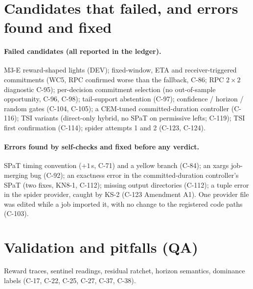 \documentclass[11pt]{article}
\begin{document}
\appendix
\section{Candidates that failed, and errors found and fixed}
\paragraph{Failed candidates (all reported in the ledger).} M3-E reward-shaped lights (DEV); fixed-window, ETA and receiver-triggered
commitments (WC5, RPC confirmed worse than the fallback, C-86; RPC $2\times2$ diagnostic C-95); per-decision commitment selection (no
out-of-sample opportunity, C-96, C-98); tail-support abstention (C-97); confidence / horizon / random gates (C-104, C-105); a CEM-tuned
committed-duration controller (C-116); TSI variants (direct-only hybrid, no SPaT on permissive lefts; C-119); TSI first confirmation
(C-114); spider attempts 1 and 2 (C-123, C-124).
\paragraph{Errors found by self-checks and fixed before any verdict.} SPaT timing convention ($+1$\,s, C-71) and a yellow branch
(C-84); an xargs job-merging bug (C-92); an exactness error in the committed-duration controller's SPaT (two fixes, KN8-1, C-112);
missing output directories (C-112); a tuple error in the spider provider, caught by KS-2 (C-123 Amendment A1). One provider file was edited
while a job imported it, with no change to the registered code paths (C-103).
\section{Validation and pitfalls (QA)}
Reward traces, sentinel readings, residual ratchet, horizon semantics, dominance labels (C-17, C-22, C-25, C-27, C-37, C-38).
\end{document}
